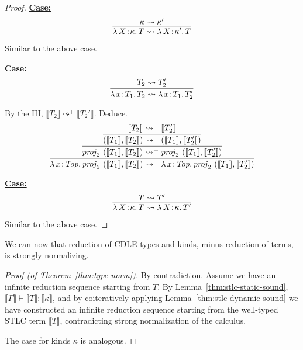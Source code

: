 \documentclass{article}
\newcommand{\abs}[4]{{#1}\, #2\! : \! #3.\, #4}
\newcommand{\interp}[1]{\llbracket #1 \rrbracket}
\newcommand{\startcase}[1]{\vspace{#1} \noindent\textbf{\underline{Case:}}}
\begin{document}
\begin{proof}
  \startcase{.2cm}
  \[
    \infer{
      \abs{\lambda}{X}{\kappa}{T}
      \leadsto
      \abs{\lambda}{X}{\kappa'}{T}
    }{
      \kappa \leadsto \kappa'
    }
  \]

  Similar to the above case.

  \startcase{.2cm}
  \[
    \infer{
      \abs{\lambda}{x}{T_1}{T_2} \leadsto \abs{\lambda}{x}{T_1}{T_2'}
    }{
      T_2 \leadsto T_2'
    }
  \]

  By the IH, \(\interp{T_2} \leadsto^+ \interp{T_2'}\).
  Deduce.
  \[
    \infer{
      \abs{\lambda}{x}{\mathit{Top}}{\mathit{proj}_2\ (\interp{T_1},\interp{T_2})}
      \leadsto^+
      \abs{\lambda}{x}{\mathit{Top}}{\mathit{proj}_2\ (\interp{T_1},\interp{T_2'})}
    }{
      \infer{
        \mathit{proj}_2\ (\interp{T_1},\interp{T_2})
        \leadsto^+
        \mathit{proj}_2\ (\interp{T_1},\interp{T_2'})
      }{
        \infer{
          (\interp{T_1},\interp{T_2})
          \leadsto^+
          (\interp{T_1},\interp{T_2'})
        }{
          \interp{T_2} \leadsto^+ \interp{T_2'}
        }
      }
    }
  \]

  \startcase{.2cm}
  \[
    \infer{
      \abs{\lambda}{X}{\kappa}{T} \leadsto \abs{\lambda}{X}{\kappa}{T'}
    }{
      T \leadsto T'
    }
  \]

  Similar to the above case.
\end{proof}

We can now that reduction of CDLE types and kinds, minus reduction of terms, is
strongly normalizing.
\begin{proof}[Proof (of Theorem~\ref{thm:type-norm})]
  By contradiction. Assume we have an infinite reduction sequence starting from
  \(T\).
  By Lemma~\ref{thm:stlc-static-sound}, \(\interp{\Gamma} \vdash \interp{T} :
  \interp{\kappa}\), and by coiteratively applying
  Lemma~\ref{thm:stlc-dynamic-sound} we have constructed an infinite reduction
  sequence starting from the well-typed STLC term \(\interp{T}\), contradicting
  strong normalization of the calculus.

  The case for kinds \(\kappa\) is analogous.
\end{proof}
\end{document}
